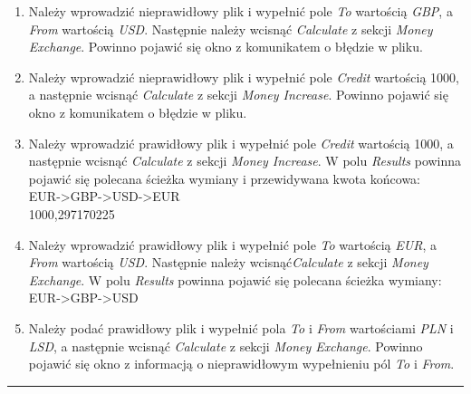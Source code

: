 \documentclass[a4paper,11pt]{article}
\newcommand{\linia}{\rule{\linewidth}{0.4mm}}
\begin{document}
\begin{enumerate}
\item Należy wprowadzić nieprawidłowy plik i wypełnić pole \textit{To} wartością \textit{GBP}, a \textit{From} wartością \textit{USD}. Następnie należy wcisnąć \textit{Calculate} z sekcji \textit{Money Exchange}. Powinno pojawić się okno z komunikatem o błędzie w pliku.
\item Należy wprowadzić nieprawidłowy plik i wypełnić pole \textit{Credit} wartością 1000, a następnie wcisnąć \textit{Calculate} z sekcji \textit{Money Increase}. Powinno pojawić się okno z komunikatem o błędzie w pliku.
\item Należy wprowadzić prawidłowy plik i wypełnić pole \textit{Credit} wartością 1000, a następnie wcisnąć \textit{Calculate} z sekcji \textit{Money Increase}. W polu \textit{Results} powinna pojawić się polecana ścieżka wymiany i przewidywana kwota końcowa:
\\EUR->GBP->USD->EUR
\\1000,297170225
\item Należy wprowadzić prawidłowy plik i wypełnić pole \textit{To} wartością \textit{EUR}, a \textit{From} wartością \textit{USD}. Następnie należy wcisnąć\textit{Calculate} z sekcji \textit{Money Exchange}. W polu \textit{Results} powinna pojawić się polecana ścieżka wymiany:
\\EUR->GBP->USD
\item Należy podać prawidłowy plik i wypełnić pola \textit{To} i \textit{From} wartościami \textit{PLN} i \textit{LSD}, a następnie wcisnąć \textit{Calculate} z sekcji \textit{Money Exchange}. Powinno pojawić się okno z informacją o nieprawidłowym wypełnieniu pól \textit{To} i \textit{From}.
\end{enumerate}
\noindent\linia
\end{document}

